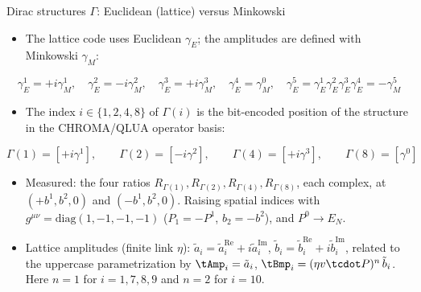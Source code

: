 \newcommand{\En}{E_N}
\newcommand{\Pa}{|\vec P^{1}|}
\newcommand{\aR}[1]{\tilde a^{\text{Re}}_{#1}}
\newcommand{\aI}[1]{\tilde a^{\text{Im}}_{#1}}
\newcommand{\bR}[1]{\tilde b^{\text{Re}}_{#1}}
\newcommand{\bI}[1]{\tilde b^{\text{Im}}_{#1}}
\newcommand{\Rr}[3]{\text{#1}\{R_{\Gamma(#2)}\}^{[#3]}}
\newcommand{\fl}{\textcolor{red}}

\begin{frame}{Dirac structures $\Gamma$: Euclidean (lattice) versus Minkowski}
  \begin{itemize}
    \item The lattice code uses Euclidean $\gamma_E$; the amplitudes are defined with Minkowski $\gamma_M$:
  \end{itemize}
  \[ \gamma^{1}_{E}=+i\gamma^{1}_{M},\quad \gamma^{2}_{E}=-i\gamma^{2}_{M},\quad \gamma^{3}_{E}=+i\gamma^{3}_{M},\quad \gamma^{4}_{E}=\gamma^{0}_{M},\quad \gamma^{5}_{E}=\gamma^{1}_{E}\gamma^{2}_{E}\gamma^{3}_{E}\gamma^{4}_{E}=-\gamma^{5}_{M} \]
  \begin{itemize}
    \item The index $i\in\{1,2,4,8\}$ of $\Gamma(i)$ is the bit-encoded position of the structure in the CHROMA/QLUA operator basis:
  \end{itemize}
  \[ \Gamma(1)=[+i\gamma^1],\qquad \Gamma(2)=[-i\gamma^2],\qquad \Gamma(4)=[+i\gamma^3],\qquad \Gamma(8)=[\gamma^0] \]
  \begin{itemize}
    \item Measured: the four ratios $R_{\Gamma(1)},R_{\Gamma(2)},R_{\Gamma(4)},R_{\Gamma(8)}$, each complex, at $(+b^1,b^2,0)$ and $(-b^1,b^2,0)$. Raising spatial indices with $g^{\mu\nu}=\mathrm{diag}(1,-1,-1,-1)$ ($P_1=-P^1$, $b_2=-b^2$), and $P^0\to\En$.
    \item Lattice amplitudes (finite link $\eta$): $\tilde a_i=\tilde a_i^{\text{Re}}+i\tilde a_i^{\text{Im}}$, $\tilde b_i=\tilde b_i^{\text{Re}}+i\tilde b_i^{\text{Im}}$, related to the uppercase parametrization by $\tAmp_i=\tilde a_i$, $\tBmp_i=(\eta v\tcdot P)^n\,\tilde b_i$. Here $n=1$ for $i=1,7,8,9$ and $n=2$ for $i=10$.
  \end{itemize}
\end{frame}

